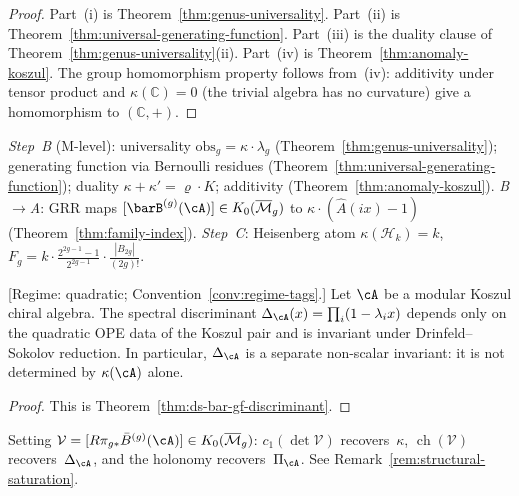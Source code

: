 \begin{proof}
Part~(i) is Theorem~\ref{thm:genus-universality}.
Part~(ii) is Theorem~\ref{thm:universal-generating-function}.
Part~(iii) is the duality clause of
Theorem~\ref{thm:genus-universality}(ii).
Part~(iv) is Theorem~\ref{thm:anomaly-koszul}.
The group homomorphism property follows from~(iv): additivity
under tensor product and $\kappa(\mathbb{C}) = 0$ (the trivial
algebra has no curvature) give a homomorphism to $(\mathbb{C}, +)$.
\end{proof}

\begin{remark}
\label{rem:theorem-d-model}
\emph{Step~B} (M-level): universality
$\mathrm{obs}_g=\kappa\cdot\lambda_g$
(Theorem~\ref{thm:genus-universality}); generating function via
Bernoulli residues (Theorem~\ref{thm:universal-generating-function});
duality $\kappa+\kappa'=\varrho\cdot K$; additivity
(Theorem~\ref{thm:anomaly-koszul}).
\emph{B$\to$A}: GRR maps $[\barB^{(g)}(\cA)]\in K_0(\overline{\mathcal{M}}_g)$
to $\kappa\cdot(\hat{A}(ix)-1)$ (Theorem~\ref{thm:family-index}).
\emph{Step~C}: Heisenberg atom $\kappa(\mathcal{H}_k)=k$,
$F_g=k\cdot\frac{2^{2g-1}-1}{2^{2g-1}}\cdot\frac{|B_{2g}|}{(2g)!}$.
\end{remark}

\begin{theorem}
\label{thm:spectral-characteristic}

\smallskip\noindent
\textup{[Regime: quadratic;
Convention~\ref{conv:regime-tags}.]}
Let $\cA$ be a modular Koszul chiral algebra.
The spectral discriminant
$\Delta_{\cA}(x) = \prod_i (1 - \lambda_i x)$
depends only on the quadratic OPE data of the Koszul pair and is invariant
under Drinfeld--Sokolov reduction.
In particular, $\Delta_{\cA}$ is a separate non-scalar invariant:
it is not determined by $\kappa(\cA)$ alone.
\end{theorem}

\begin{proof}
This is Theorem~\ref{thm:ds-bar-gf-discriminant}.
\end{proof}

\begin{remark}\label{rem:spectral-characteristic-programme}
Setting $\mathcal{V}=[R\pi_{g*}\bar{B}^{(g)}(\cA)]\in
K_0(\overline{\mathcal{M}}_g)$: $c_1(\det\mathcal{V})$
recovers~$\kappa$, $\operatorname{ch}(\mathcal{V})$
recovers~$\Delta_{\cA}$, and the holonomy recovers~$\Pi_{\cA}$.
See Remark~\ref{rem:structural-saturation}.
\end{remark}

